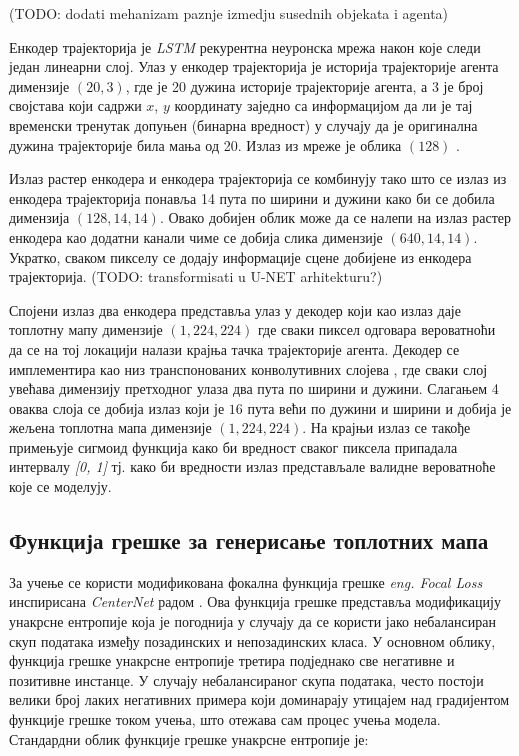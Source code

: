 \documentclass[11pt,oneside]{memoir}
\begin{document}
(TODO: dodati mehanizam paznje izmedju susednih objekata i agenta)

Енкодер трајекторија је \textit{LSTM} рекурентна неуронска мрежа након које следи један линеарни слој. Улаз у енкодер трајекторија је
историја трајекторије агента димензије $(20, 3)$, 
где је 20 дужина историје трајекторије агента, а 3 је број својстава који садржи $x$, $y$ координату заједно са информацијом да ли је тај 
временски тренутак допуњен (бинарна вредност) у случају да је оригинална дужина трајекторије била мања од 20. Излаз из мреже је облика $(128)$
\cite{home}.

Излаз растер енкодера и енкодера трајекторија се комбинују тако што се излаз из енкодера трајекторија понавља 14 пута по
ширини и дужини како би се добила
димензија $(128, 14, 14)$. Овако добијен облик може да се налепи на излаз растер енкодера као додатни канали 
чиме се добија слика димензије $(640, 14, 14)$. Укратко, сваком пикселу се додају информације сцене добијене из енкодера трајекторија.
(TODO: transformisati u U-NET arhitekturu?)

Спојени излаз два енкодера представља улаз у декодер који као излаз даје топлотну мапу димензије $(1, 224, 224)$ где сваки пиксел одговара
вероватноћи да се на тој локацији налази крајња тачка трајекторије агента. Декодер се имплементира као низ транспонованих конволутивних слојева
\cite{guide_to_cnn_arithm}, где сваки слој увећава димензију претходног улаза два пута по ширини и дужини. 
Слагањем 4 оваква слоја се добија излаз који је $16$ пута
већи по дужини и ширини и добија је жељена топлотна мапа димензије $(1, 224, 224)$. 
На крајњи излаз се такође примењује сигмоид функција како би вредност сваког
пиксела припадала интервалу \textit{[0, 1]} тј. како би вредности излаз представљале валидне вероватноће које се моделују. 

\subsection{Функција грешке за генерисање топлотних мапа}

За учење се користи модификована фокална функција грешке \textit{eng. Focal Loss} 
инспирисана \textit{CenterNet} радом \cite{centernet, focal_loss}. Ова функција грешке
представља модификацију унакрсне ентропије која је погоднија у случају да се користи јако небалансиран скуп података између позадинских и непозадинских
класа. У основном облику, функција грешке унакрсне ентропије третира подједнако све негативне и позитивне инстанце. 
У случају небалансираног скупа података, често постоји велики број лаких негативних примера који доминарају утицајем над градијентом
функције грешке током учења, што отежава сам процес учења модела. Стандардни облик функције грешке унакрсне ентропије је: 
\end{document}
